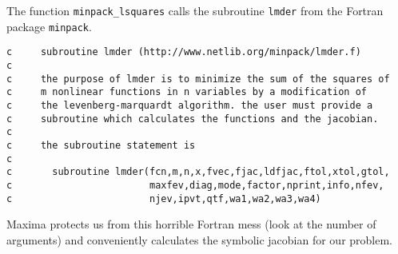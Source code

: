 The function \verb!minpack_lsquares! calls the subroutine \verb!lmder!
from the Fortran package \verb!minpack!.
{\tiny
\begin{verbatim}
c     subroutine lmder (http://www.netlib.org/minpack/lmder.f)
c
c     the purpose of lmder is to minimize the sum of the squares of
c     m nonlinear functions in n variables by a modification of
c     the levenberg-marquardt algorithm. the user must provide a
c     subroutine which calculates the functions and the jacobian.
c
c     the subroutine statement is
c
c       subroutine lmder(fcn,m,n,x,fvec,fjac,ldfjac,ftol,xtol,gtol,
c                        maxfev,diag,mode,factor,nprint,info,nfev,
c                        njev,ipvt,qtf,wa1,wa2,wa3,wa4)
\end{verbatim}}

Maxima protects us from this horrible Fortran mess (look at the number
of arguments) and conveniently calculates the symbolic jacobian for
our problem.


